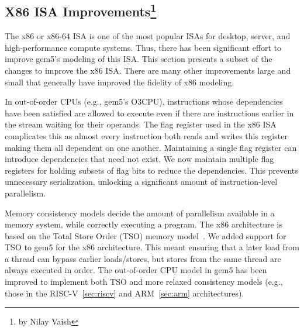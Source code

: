 \subsection[X86 ISA Improvements]{X86 ISA Improvements\footnote{by Nilay Vaish}}

The x86 or x86-64 ISA is one of the most popular ISAs for desktop, server, and high-performance compute systems.
Thus, there has been significant effort to improve gem5's modeling of this ISA.
This section presents a subset of the changes to improve the x86 ISA.
There are many other improvements large and small that generally have improved the fidelity of x86 modeling.

In out-of-order CPUs (e.g., gem5's O3CPU), instructions whose dependencies have been satisfied are allowed to execute even if there are instructions earlier in the stream waiting for their operands.
The flag register used in the x86 ISA complicates this as almost every instruction both reads and writes this register making them all dependent on one another.
Maintaining a single flag register can introduce dependencies that need not exist.
We now maintain multiple flag registers for holding subsets of flag bits to reduce the dependencies.
This prevents unnecessary serialization, unlocking a significant amount of instruction-level parallelism.

Memory consistency models decide the amount of parallelism available in a memory system, while correctly executing a program.
The x86 architecture is based on the Total Store Order (TSO) memory model~\cite{coherenceprimer}.
We added support for TSO to gem5 for the x86 architecture.
This meant ensuring that a later load from a thread can bypass earlier loads/stores, but stores from the same thread are always executed in order.
The out-of-order CPU model in gem5 has been improved to implement both TSO and more relaxed consistency models (e.g., those in the RISC-V~\ref{sec:riscv} and ARM~\ref{sec:arm} architectures).

